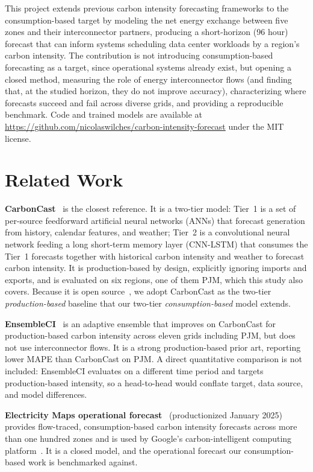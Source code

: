 \documentclass[sigconf,nonacm,a4paper]{acmart}  %
\begin{document}
This project extends previous carbon intensity forecasting frameworks to the
consumption-based target by modeling the net energy exchange between five zones and
their interconnector partners, producing a short-horizon (96 hour) forecast that
can inform systems scheduling data center workloads by a region's carbon intensity.
The contribution is not introducing consumption-based forecasting as a target,
since operational systems already exist, but opening a closed method, measuring
the role of energy interconnector flows (and finding that, at the studied horizon,
they do not improve accuracy), characterizing where forecasts succeed and fail across
diverse grids, and providing a reproducible benchmark.
Code and trained models are available at \url{https://github.com/nicolaswilches/carbon-intensity-forecast} under the MIT license.

\section{Related Work}
\textbf{CarbonCast}~\cite{maji2022carboncast} is the closest
reference. It is a two-tier model: Tier~1 is a set of
per-source feedforward artificial neural networks (ANNs) that forecast generation from history, calendar features, and weather; Tier~2 is a convolutional neural network feeding a long short-term memory layer (CNN-LSTM) that consumes the Tier~1 forecasts together with historical carbon intensity and weather to forecast carbon intensity. It is production-based by design, explicitly ignoring imports and exports, and is evaluated on six regions, one of them PJM, which this study also covers. Because it is open source~\cite{ucscospre2025}, we adopt CarbonCast as the two-tier \emph{production-based} baseline that our two-tier \emph{consumption-based} model extends.

\textbf{EnsembleCI}~\cite{yan2025ensembleci} is an adaptive ensemble that improves on
CarbonCast for production-based carbon intensity across eleven grids including PJM,
but does not use interconnector flows. It is a strong production-based prior art,
reporting lower MAPE than CarbonCast on PJM. A direct quantitative comparison is not
included: EnsembleCI evaluates on a different time period and targets production-based
intensity, so a head-to-head would conflate target, data source, and model differences.

\textbf{Electricity Maps operational forecast}~\cite{electricitymaps2025forecast} (productionized January 2025)
provides flow-traced, consumption-based carbon intensity forecasts across more
than one hundred zones and is used by Google's carbon-intelligent computing
platform~\cite{radovanovic2023carbon}. It is a closed model, and the operational forecast our consumption-based
work is benchmarked against.
\end{document}
